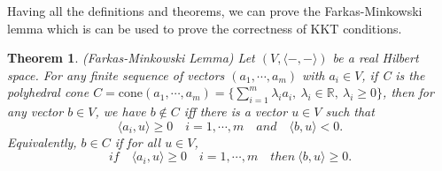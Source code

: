 \documentclass[a4paper,12pt]{report}
\newtheorem{theorem}{Theorem}[section]
\begin{document}
Having all the definitions and theorems, we can prove the Farkas-Minkowski lemma which is can be used to prove the correctness of KKT conditions.

\begin{theorem}
    (Farkas-Minkowski Lemma\cite{gallier2019algebra}) Let $(V,\langle -,- \rangle)$ be a real Hilbert space. For any finite sequence of vectors $(a_1,\cdots,a_m)$ with $a_i\in V$, if C is the polyhedral cone $C=\mathrm{cone}(a_1,\cdots,a_m)=\{ \sum_{i=1}^{m} \lambda_i a_i, \ \lambda_i\in \mathbb R, \ \lambda_i \geq 0\}$, then for any vector $b\in V$, we have $b\notin C$ iff there is a vector $u\in V$ such that
    \[
        \langle a_i, u\rangle \geq 0 \quad i=1,\cdots,m \quad and \quad \langle b, u \rangle <0.
    \]
    Equivalently, $b\in C$ if for all $u\in V$,
    \[
        if \quad \langle a_i,u\rangle \geq 0 \quad i=1,\cdots,m\quad then \ \langle b,u\rangle \geq 0.
    \]
\end{theorem}
\end{document}
